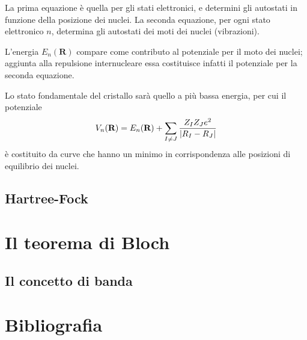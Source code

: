 La prima equazione è quella per gli stati elettronici, e determini gli autostati in funzione della posizione dei nuclei. La seconda equazione, per ogni stato elettronico $ n $, determina gli autostati dei moti dei nuclei (vibrazioni).

L'energia $ E_n(\textbf{R}) $ compare come contributo al potenziale per il moto dei nuclei; aggiunta alla repulsione internucleare essa costituisce infatti il potenziale per la seconda equazione.

Lo stato fondamentale del cristallo sarà quello a più bassa energia, per cui il potenziale
\[ V_n(\textbf{R}) = E_n(\textbf{R}) + \sum_{I \neq J} \frac{Z_I Z_J e^2}{\abs{R_I - R_J}} \]
è costituito da curve che hanno un minimo in corrispondenza alle posizioni di equilibrio dei nuclei.

\subsection{Hartree-Fock}

\section{Il teorema di Bloch}

\subsection{Il concetto di banda}

\section{Bibliografia}